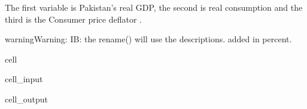 \documentclass[letterpaper,10pt,english]{jupyterBook}
\begin{document}
\sphinxAtStartPar
The first variable  is Pakistan’s real GDP, the second  is real consumption and the third is the Consumer price deflator .

\begin{sphinxadmonition}{warning}{Warning:}
\sphinxAtStartPar
IB: the rename()  will use the descriptions.
added in percent.
\end{sphinxadmonition}

\begin{sphinxuseclass}{cell}\begin{sphinxVerbatimInput}

\begin{sphinxuseclass}{cell_input}
\begin{sphinxVerbatim}[commandchars=\\\{\}]
\PYG{p}{[}\PYG{p}{]}
\end{sphinxVerbatim}

\end{sphinxuseclass}\end{sphinxVerbatimInput}
\begin{sphinxVerbatimOutput}

\begin{sphinxuseclass}{cell_output}
\noindent{}

\end{sphinxuseclass}\end{sphinxVerbatimOutput}

\end{sphinxuseclass}
\end{document}
